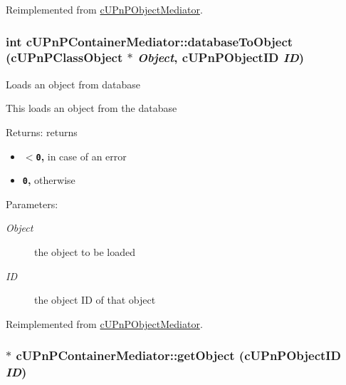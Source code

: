 Reimplemented from \hyperlink{classcUPnPObjectMediator_bfbca3f1cbadacee2b21306364750f26}{cUPnPObjectMediator}.\hypertarget{classcUPnPContainerMediator_79f483b48f596047ed9549f0b036f35b}{
\subsubsection[{databaseToObject}]{\setlength{\rightskip}{0pt plus 5cm}int cUPnPContainerMediator::databaseToObject ({\bf cUPnPClassObject} $\ast$ {\em Object}, \/  {\bf cUPnPObjectID} {\em ID})}}
\label{classcUPnPContainerMediator_79f483b48f596047ed9549f0b036f35b}


Loads an object from database

This loads an object from the database

\begin{Desc}
\item[Returns:]returns\begin{itemize}
\item {\bf {\tt $<$0},} in case of an error\item {\bf {\tt 0},} otherwise \end{itemize}
\end{Desc}
\begin{Desc}
\item[Parameters:]
\begin{description}
\item[{\em Object}]the object to be loaded \item[{\em ID}]the object ID of that object \end{description}
\end{Desc}


Reimplemented from \hyperlink{classcUPnPObjectMediator_07a6a1d2694fb2f4573bd50374406b24}{cUPnPObjectMediator}.\hypertarget{classcUPnPContainerMediator_78b71f96fb4289dc78f897d6282078d6}{
\subsubsection[{getObject}]{ $\ast$ cUPnPContainerMediator::getObject ({\bf cUPnPObjectID} {\em ID})}}
\label{classcUPnPContainerMediator_78b71f96fb4289dc78f897d6282078d6}


